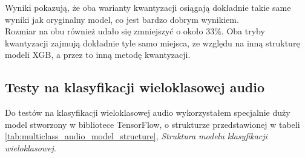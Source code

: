 Wyniki pokazują, że oba warianty kwantyzacji osiągają dokładnie takie same wyniki jak oryginalny model, co jest bardzo dobrym wynikiem. \\
Rozmiar na obu również udało się zmniejszyć o około 33\%. Oba tryby kwantyzacji zajmują dokładnie tyle samo miejsca, ze względu na inną strukturę modeli XGB, a przez to inną metodę kwantyzacji. \\

\subsection{Testy na klasyfikacji wieloklasowej audio}
Do testów na klasyfikacji wieloklasowej audio wykorzystałem specjalnie duży model stworzony w bibliotece TensorFlow, o strukturze przedstawionej w tabeli \ref{tab:multiclass_audio_model_structure}, \textit{Struktura modelu klasyfikacji wieloklasowej}. \\

